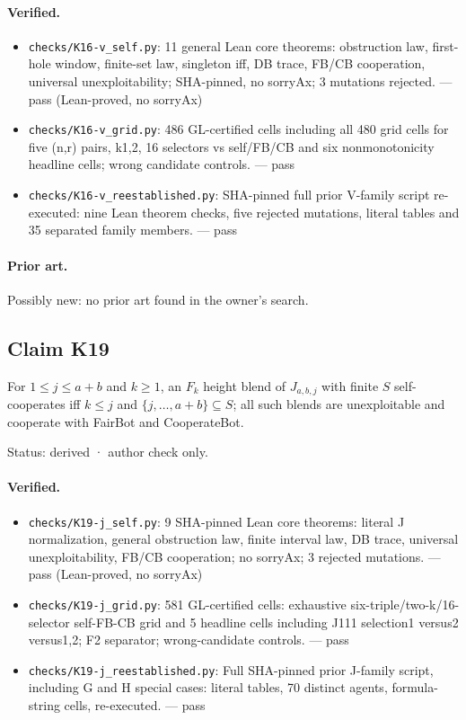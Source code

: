 \documentclass{article}
\begin{document}
\paragraph{Verified.}
\begin{itemize}
\item \texttt{checks/K16-v\_self.py}: 11 general Lean core theorems: obstruction law, first-hole window, finite-set law, singleton iff, DB trace, FB/CB cooperation, universal unexploitability; SHA-pinned, no sorryAx; 3 mutations rejected. --- pass (Lean-proved, no sorryAx)
\item \texttt{checks/K16-v\_grid.py}: 486 GL-certified cells including all 480 grid cells for five (n,r) pairs, k1,2, 16 selectors vs self/FB/CB and six nonmonotonicity headline cells; wrong candidate controls. --- pass
\item \texttt{checks/K16-v\_reestablished.py}: SHA-pinned full prior V-family script re-executed: nine Lean theorem checks, five rejected mutations, literal tables and 35 separated family members. --- pass
\end{itemize}

\paragraph{Prior art.} Possibly new: no prior art found in the owner's search.

\subsection*{Claim K19}

For $1\le j\le a+b$ and $k\ge1$, an $F_k$ height blend of $J_{a,b,j}$ with finite $S$ self-cooperates iff $k\le j$ and $\{j,\ldots,a+b\}\subseteq S$; all such blends are unexploitable and cooperate with FairBot and CooperateBot.

Status: derived · author check only.

\paragraph{Verified.}
\begin{itemize}
\item \texttt{checks/K19-j\_self.py}: 9 SHA-pinned Lean core theorems: literal J normalization, general obstruction law, finite interval law, DB trace, universal unexploitability, FB/CB cooperation; no sorryAx; 3 rejected mutations. --- pass (Lean-proved, no sorryAx)
\item \texttt{checks/K19-j\_grid.py}: 581 GL-certified cells: exhaustive six-triple/two-k/16-selector self-FB-CB grid and 5 headline cells including J111 selection1 versus2 versus1,2; F2 separator; wrong-candidate controls. --- pass
\item \texttt{checks/K19-j\_reestablished.py}: Full SHA-pinned prior J-family script, including G and H special cases: literal tables, 70 distinct agents, formula-string cells, re-executed. --- pass
\end{itemize}
\end{document}
